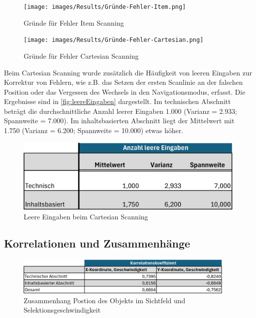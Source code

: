 \begin{figure}[tbh]
 \centering
\texttt{[image: images/Results/Gründe-Fehler-Item.png]}
 \caption{Gründe für Fehler Item Scanning}
 \label{fig:gründeFehlerItem}
\end{figure}

\begin{figure}[tbh]
 \centering
\texttt{[image: images/Results/Gründe-Fehler-Cartesian.png]}
 \caption{Gründe für Fehler Cartesian Scanning}
 \label{fig:gründeFehlerCartesian}
\end{figure}

Beim Cartesian Scanning wurde zusätzlich die Häufigkeit von leeren Eingaben zur Korrektur von Fehlern, wie z.B. das Setzen der ersten Scanlinie an der falschen Position oder das Vergessen des Wechsels in den Navigationsmodus, erfasst. Die Ergebnisse sind in \autoref{fig:leereEingaben} dargestellt. 
Im technischen Abschnitt beträgt die durchschnittliche Anzahl leerer Eingaben 1.000 (Varianz = 2.933; Spannweite = 7.000). Im inhaltsbasierten Abschnitt liegt der Mittelwert mit 1.750 (Varianz = 6.200; Spannweite = 10.000) etwas höher.

\begin{figure}[tbh]
    \centering
    \includegraphics{images/Results/leereEingaben.png}
    \caption{Leere Eingaben beim Cartesian Scanning}
    \label{fig:leereEingaben}
\end{figure}
\subsection{Korrelationen und Zusammenhänge}

\begin{figure}[tbh]
    \centering
   \includegraphics[width=0.95\textwidth]{images/Results/Korrelation-Position-Geschwindigkeit-Table.png}
    \caption{Zusammenhang Postion des Objekts im Sichtfeld und Selektionsgeschwindigkeit}
    \label{fig:tableKorrPosGeschwindigkeit}
   \end{figure}

